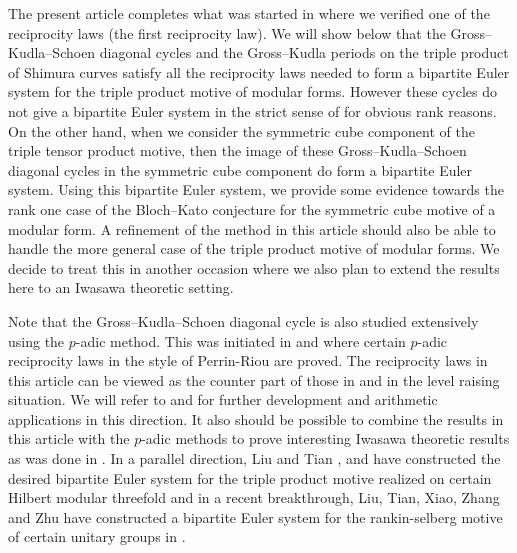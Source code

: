 \documentclass[10pt]{amsart}
\numberwithin{equation}{section}
\theoremstyle{plain}
\numberwithin{equation}{section}
\theoremstyle{definition}
\theoremstyle{remark}
\begin{document}
The present article completes what was started in \cite{Wang} where we verified one of the reciprocity laws (the first reciprocity law). We will show below that the Gross--Kudla--Schoen diagonal cycles and the Gross--Kudla periods on the triple product of Shimura curves satisfy all the reciprocity laws needed to form a bipartite Euler system for the triple product motive of modular forms. However these cycles do not give a bipartite Euler system in the strict sense of \cite{How} for obvious rank reasons.  On the other hand, when we consider the symmetric cube component of the triple tensor product motive, then the image of these Gross--Kudla--Schoen diagonal cycles in the symmetric cube component do form a bipartite Euler system. Using this bipartite Euler system,  we provide some evidence towards the rank one case of the Bloch--Kato conjecture for the symmetric cube motive of a modular form. A refinement of the method in this article should also be able to handle the more general case of the triple product motive of modular forms. We decide to treat this in another occasion where we also plan to extend the results here to an Iwasawa theoretic setting.


Note that the Gross--Kudla--Schoen diagonal cycle is also studied extensively using the $p$-adic method. This was initiated in \cite{DR-1} and \cite{DR-2} where certain $p$-adic reciprocity laws in the style of Perrin-Riou are proved. The reciprocity laws in this article can be viewed as the counter part of those in \cite{DR-1}  and \cite{DR-2} in the level raising situation. We will refer to \cite{BDRSV} and \cite{Ca-H} for further development and arithmetic applications in this direction. It also should be possible to combine the results in this article with the $p$-adic methods to prove interesting Iwasawa theoretic results as was done in \cite{BD}. In a parallel direction, Liu and Tian \cite{Liu-HZ}, \cite{Liu-cubic} and \cite{LT} have constructed the desired bipartite Euler system for the triple product motive realized on certain Hilbert modular threefold and in a recent breakthrough, Liu, Tian, Xiao, Zhang and Zhu have constructed a bipartite Euler system for the rankin-selberg motive of certain unitary groups in \cite{LTX, LTXZZ}.
\end{document}
